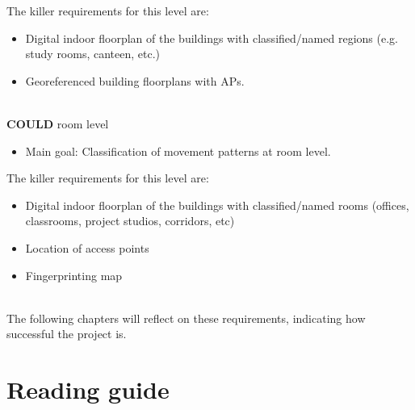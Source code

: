 The killer requirements for this level are:
\begin{itemize}
\item Digital indoor floorplan of the buildings with classified/named regions (e.g. study rooms, canteen, etc.)
\item Georeferenced building floorplans with APs.\\\\
\end{itemize}
\textbf{COULD} room level
\begin{itemize}
\item {\color{black!50}Main goal: Classification of movement patterns at room level.}
\end{itemize}
The killer requirements for this level are:
\begin{itemize}
\item {\color{black!50}Digital indoor floorplan of the buildings with classified/named rooms (offices, classrooms, project studios, corridors, etc)}
\item {\color{black!50}Location of access points}
\item {\color{black!50}Fingerprinting map}\\\\
\end{itemize}
The following chapters will reflect on these requirements, indicating how successful the project is.
\pagebreak

\section{Reading guide}

